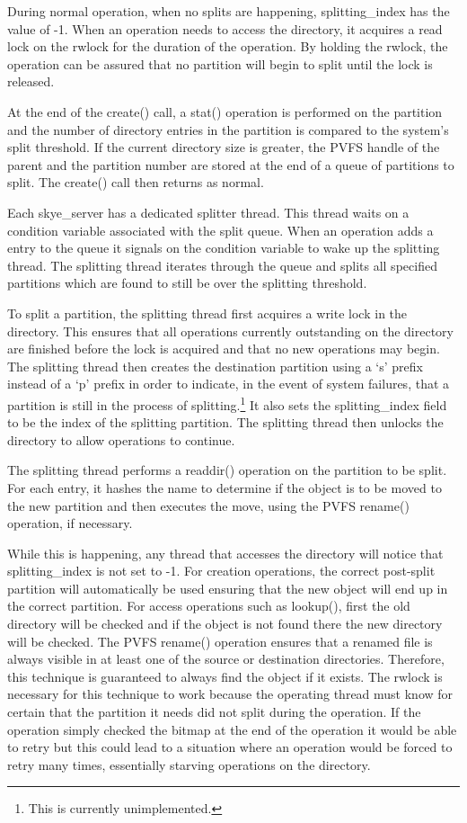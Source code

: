 \documentclass[letterpaper]{article}
\begin{document}
During normal operation, when no splits are happening, splitting\_\-index has the
value of -1.  When an operation needs to access the directory, it acquires a
read lock on the rwlock for the duration of the operation.  By holding the
rwlock, the operation can be assured that no partition will begin to split until
the lock is released.

At the end of the create() call, a stat() operation is performed on the
partition and the number of directory entries in the partition is compared to
the system's split threshold.  If the current directory size is greater, the
PVFS handle of the parent and the partition number are stored at the end of a
queue of partitions to split.  The create() call then returns as normal.

Each skye\_\-server has a dedicated splitter thread.  This thread waits on a
condition variable associated with the split queue.  When an operation adds a
entry to the queue it signals on the condition variable to wake up the splitting
thread.  The splitting thread iterates through the queue and splits all
specified partitions which are found to still be over the splitting threshold.

To split a partition, the splitting thread first acquires a write lock in the
directory.  This ensures that all operations currently outstanding on the
directory are finished before the lock is acquired and that no new operations
may begin.  The splitting thread then creates the destination partition using a
`s' prefix instead of a `p' prefix in order to indicate, in the event of system
failures, that a partition is still in the process of splitting.\footnote{This
is currently unimplemented.}  It also sets the splitting\_\-index field to be
the index of the splitting partition.  The splitting thread then unlocks the
directory to allow operations to continue.

The splitting thread performs a readdir() operation on the partition to be
split.  For each entry, it hashes the name to determine if the object is to be
moved to the new partition and then executes the move, using the PVFS rename()
operation, if necessary.

While this is happening, any thread that accesses the directory will notice that
splitting\_\-index is not set to -1.  For creation operations, the correct
post-split partition will automatically be used ensuring that the new object
will end up in the correct partition.  For access operations such as lookup(),
first the old directory will be checked and if the object is not found there the
new directory will be checked.  The PVFS rename() operation ensures that a
renamed file is always visible in at least one of the source or destination
directories.  Therefore, this technique is guaranteed to always find the object 
if it exists.  The rwlock is necessary for this technique to work because the
operating thread must know for certain that the partition it needs did not split
during the operation.  If the operation simply checked the bitmap at the end of
the operation it would be able to retry but this could lead to a situation where
an operation would be forced to retry many times, essentially starving
operations on the directory.
\end{document}
